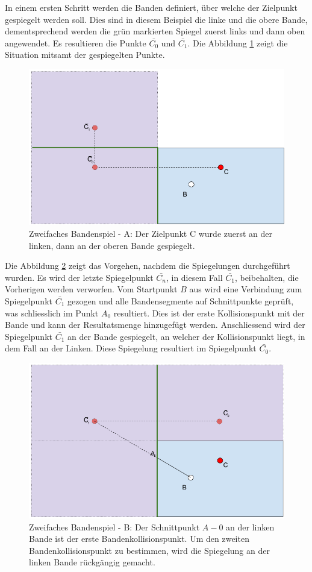 \newpage
In einem ersten Schritt werden die Banden definiert, über welche der Zielpunkt gespiegelt werden soll. Dies sind in
diesem Beispiel die linke und die obere Bande, dementsprechend werden die grün markierten Spiegel zuerst links und
dann oben angewendet. Es resultieren die Punkte $\bar{C_0}$ und $\bar{C_1}$. Die Abbildung \ref{fig:zweifaches_bandenspiel_a} zeigt die
Situation mitsamt der gespiegelten Punkte.
\begin{figure}[h]
    \begin{center}
        \includegraphics[width=0.5\linewidth]{../common/03_billiard_ai/resources/50_rail_reflection_2_a.png}
    \end{center}
    \caption{Zweifaches Bandenspiel - A: Der Zielpunkt C wurde zuerst an der linken, dann an der oberen Bande gespiegelt.}
    \label{fig:zweifaches_bandenspiel_a}
\end{figure}

Die Abbildung \ref{fig:zweifaches_bandenspiel_b} zeigt das Vorgehen, nachdem die Spiegelungen durchgeführt wurden.
Es wird der letzte Spiegelpunkt $\bar{C_n}$, in diesem Fall $\bar{C_1}$,
beibehalten, die Vorherigen werden verworfen. Vom Startpunkt $B$ aus wird eine Verbindung zum Spiegelpunkt $\bar{C_1}$
gezogen und alle Bandensegmente auf Schnittpunkte geprüft, was schliesslich im Punkt $A_0$ resultiert. Dies ist
der erste Kollisionspunkt mit der Bande und kann der Resultatsmenge hinzugefügt werden. Anschliessend wird der Spiegelpunkt
$\bar{C_1}$ an der Bande gespiegelt, an welcher der Kollisionspunkt liegt, in dem Fall an der Linken. Diese Spiegelung
resultiert im Spiegelpunkt $\bar{C_0}$.
\begin{figure}[h]
    \begin{center}
        \includegraphics[width=0.5\linewidth]{../common/03_billiard_ai/resources/51_rail_reflection_2_b.png}
    \end{center}
    \caption{Zweifaches Bandenspiel - B: Der Schnittpunkt $A-0$ an der linken Bande ist der erste Bandenkollisionspunkt.
    Um den zweiten Bandenkollisionspunkt zu bestimmen, wird die Spiegelung an der linken Bande rückgängig gemacht.}
    \label{fig:zweifaches_bandenspiel_b}
\end{figure}

